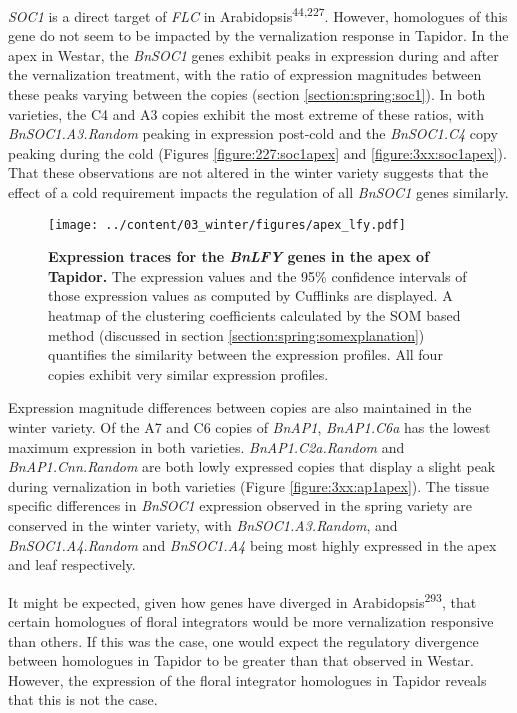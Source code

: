 \documentclass[12pt,]{book}
\begin{document}
\emph{SOC1} is a direct target of \emph{FLC} in
Arabidopsis\textsuperscript{44,227}. However, homologues of this gene do
not seem to be impacted by the vernalization response in Tapidor. In the
apex in Westar, the \emph{BnSOC1} genes exhibit peaks in expression
during and after the vernalization treatment, with the ratio of
expression magnitudes between these peaks varying between the copies
(section \ref{section:spring:soc1}). In both varieties, the C4 and A3
copies exhibit the most extreme of these ratios, with
\emph{BnSOC1.A3.Random} peaking in expression post-cold and the
\emph{BnSOC1.C4} copy peaking during the cold (Figures
\ref{figure:227:soc1apex} and \ref{figure:3xx:soc1apex}). That these
observations are not altered in the winter variety suggests that the
effect of a cold requirement impacts the regulation of all \emph{BnSOC1}
genes similarly.

\begin{figure}[htbp]
\centering
\texttt{[image: ../content/03\_winter/figures/apex\_lfy.pdf]}
\caption{\textbf{Expression traces for the \emph{BnLFY} genes in the
apex of Tapidor.} The expression values and the 95\% confidence
intervals of those expression values as computed by Cufflinks are
displayed. A heatmap of the clustering coefficients calculated by the
SOM based method (discussed in section
\ref{section:spring:somexplanation}) quantifies the similarity between
the expression profiles. All four copies exhibit very similar expression
profiles.}\label{figure:3xx:lfyapex}
\end{figure}

Expression magnitude differences between copies are also maintained in
the winter variety. Of the A7 and C6 copies of \emph{BnAP1},
\emph{BnAP1.C6a} has the lowest maximum expression in both varieties.
\emph{BnAP1.C2a.Random} and \emph{BnAP1.Cnn.Random} are both lowly
expressed copies that display a slight peak during vernalization in both
varieties (Figure \ref{figure:3xx:ap1apex}). The tissue specific
differences in \emph{BnSOC1} expression observed in the spring variety
are conserved in the winter variety, with \emph{BnSOC1.A3.Random}, and
\emph{BnSOC1.A4.Random} and \emph{BnSOC1.A4} being most highly expressed
in the apex and leaf respectively.

It might be expected, given how genes have diverged in
Arabidopsis\textsuperscript{293}, that certain homologues of floral
integrators would be more vernalization responsive than others. If this
was the case, one would expect the regulatory divergence between
homologues in Tapidor to be greater than that observed in Westar.
However, the expression of the floral integrator homologues in Tapidor
reveals that this is not the case.
\end{document}
